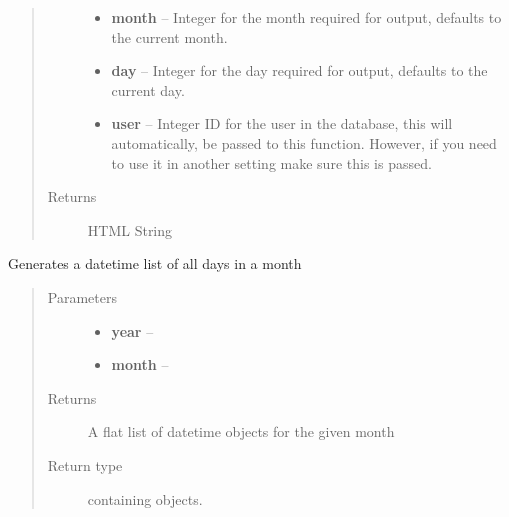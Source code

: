 \documentclass[letterpaper,10pt,english]{sphinxmanual}
\begin{document}
\begin{fulllineitems}
\begin{quote}
\begin{description}
\begin{itemize}
\item {} 
\textbf{month} -- Integer for the month required for output, defaults to the
current month.

\item {} 
\textbf{day} -- Integer for the day required for output, defaults to the
current day.

\item {} 
\textbf{user} -- Integer ID for the user in the database, this will automatically,
be passed to this function. However, if you need to use it in
another setting make sure this is passed.

\end{itemize}

\item[{Returns}] \leavevmode
HTML String

\end{description}\end{quote}

\end{fulllineitems}


\begin{fulllineitems}
\label{timetracker:timetracker.utils.calendar_utils.gen_datetime_cal}
Generates a datetime list of all days in a month
\begin{quote}\begin{description}
\item[{Parameters}] \leavevmode\begin{itemize}
\item {} 
\textbf{year} -- 

\item {} 
\textbf{month} -- 

\end{itemize}

\item[{Returns}] \leavevmode
A flat list of datetime objects for the given month

\item[{Return type}] \leavevmode
{} containing  objects.

\end{description}\end{quote}

\end{fulllineitems}
\end{document}
